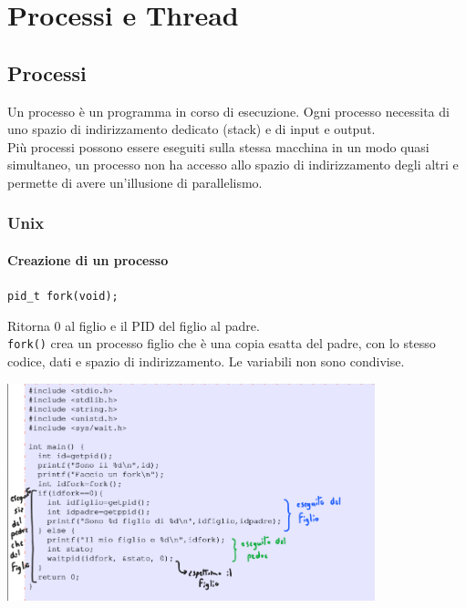 \documentclass[12pt, a4paper]{report}
\begin{document}
    \chapter{Processi e Thread}
        \section{Processi}
            Un processo è un programma in corso di esecuzione. Ogni processo necessita di uno spazio di indirizzamento dedicato (stack) e di input e output. \\
            Più processi possono essere eseguiti sulla stessa macchina in un modo quasi simultaneo, un processo non ha accesso allo spazio di indirizzamento degli altri e permette di avere un'illusione di parallelismo.
            \subsection{Unix}
                \subsubsection{Creazione di un processo}
                    \begin{center}
                        \texttt{pid\_t fork(void);}
                    \end{center}
                    Ritorna 0 al figlio e il PID del figlio al padre. \\
                    \texttt{fork()} crea un processo figlio che è una copia esatta del padre, con lo stesso codice, dati e spazio di indirizzamento. Le variabili non sono condivise.
                    \begin{center}
                        \includegraphics[width=0.8\textwidth]{Images/fork.png}
                    \end{center}
\end{document}
